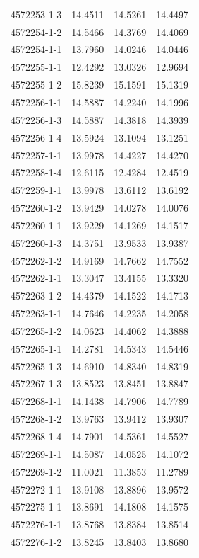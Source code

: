 \begin{longtable}{lrrr}
4572253-1-3 & 14.4511 & 14.5261 & 14.4497 \\
4572254-1-2 & 14.5466 & 14.3769 & 14.4069 \\
4572254-1-1 & 13.7960 & 14.0246 & 14.0446 \\
4572255-1-1 & 12.4292 & 13.0326 & 12.9694 \\
4572255-1-2 & 15.8239 & 15.1591 & 15.1319 \\
4572256-1-1 & 14.5887 & 14.2240 & 14.1996 \\
4572256-1-3 & 14.5887 & 14.3818 & 14.3939 \\
4572256-1-4 & 13.5924 & 13.1094 & 13.1251 \\
4572257-1-1 & 13.9978 & 14.4227 & 14.4270 \\
4572258-1-4 & 12.6115 & 12.4284 & 12.4519 \\
4572259-1-1 & 13.9978 & 13.6112 & 13.6192 \\
4572260-1-2 & 13.9429 & 14.0278 & 14.0076 \\
4572260-1-1 & 13.9229 & 14.1269 & 14.1517 \\
4572260-1-3 & 14.3751 & 13.9533 & 13.9387 \\
4572262-1-2 & 14.9169 & 14.7662 & 14.7552 \\
4572262-1-1 & 13.3047 & 13.4155 & 13.3320 \\
4572263-1-2 & 14.4379 & 14.1522 & 14.1713 \\
4572263-1-1 & 14.7646 & 14.2235 & 14.2058 \\
4572265-1-2 & 14.0623 & 14.4062 & 14.3888 \\
4572265-1-1 & 14.2781 & 14.5343 & 14.5446 \\
4572265-1-3 & 14.6910 & 14.8340 & 14.8319 \\
4572267-1-3 & 13.8523 & 13.8451 & 13.8847 \\
4572268-1-1 & 14.1438 & 14.7906 & 14.7789 \\
4572268-1-2 & 13.9763 & 13.9412 & 13.9307 \\
4572268-1-4 & 14.7901 & 14.5361 & 14.5527 \\
4572269-1-1 & 14.5087 & 14.0525 & 14.1072 \\
4572269-1-2 & 11.0021 & 11.3853 & 11.2789 \\
4572272-1-1 & 13.9108 & 13.8896 & 13.9572 \\
4572275-1-1 & 13.8691 & 14.1808 & 14.1575 \\
4572276-1-1 & 13.8768 & 13.8384 & 13.8514 \\
4572276-1-2 & 13.8245 & 13.8403 & 13.8680 \\

\end{longtable}
